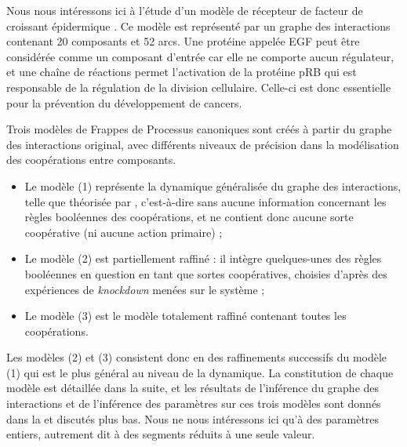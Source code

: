 Nous nous intéressons ici à l'étude d'un modèle de récepteur de facteur de croissant épidermique
\cite{Sahin09}.
Ce modèle est représenté par un graphe des interactions contenant 20 composants et 52 arcs.
Une protéine appelée EGF peut être considérée comme un composant d'entrée
car elle ne comporte aucun régulateur,
et une chaîne de réactions permet l'activation de la protéine pRB qui est responsable
de la régulation de la division cellulaire.
Celle-ci est donc essentielle pour la prévention du développement de cancers.

Trois modèles de Frappes de Processus canoniques
sont créés à partir du graphe des interactions original, avec différents niveaux
de précision dans la modélisation des coopérations entre composants.
\begin{itemize}
  \item Le modèle (1) représente la dynamique généralisée du graphe des interactions,
    telle que théorisée par ,
    c'est-à-dire sans aucune information concernant les règles booléennes des coopérations,
    et ne contient donc aucune sorte coopérative (ni aucune action primaire) ;
  \item Le modèle (2) est partiellement raffiné : il intègre quelques-unes des règles
    booléennes en question en tant que sortes coopératives,
    choisies d'après des expériences de \textit{knockdown} menées sur le système ;
  \item Le modèle (3) est le modèle totalement raffiné contenant toutes les coopérations.
\end{itemize}
Les modèles (2) et (3) consistent donc en des raffinements successifs du modèle (1)
qui est le plus général au niveau de la dynamique.
La constitution de chaque modèle est détaillée dans la suite,
et les résultats de l'inférence du graphe des interactions et de l'inférence des paramètres
sur ces trois modèles sont donnés dans la 
et discutés plus bas.
Nous ne nous intéressons ici qu'à des paramètres entiers,
autrement dit à des segments réduits à une seule valeur.

